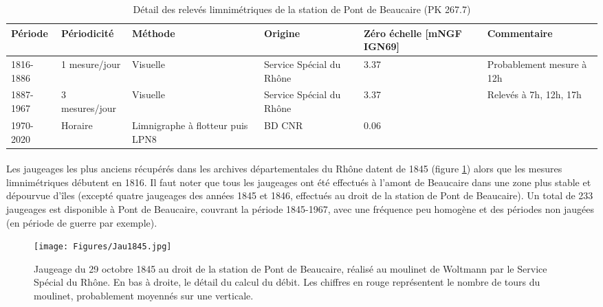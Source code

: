 \documentclass[11pt]{article}
\begin{document}
    
	\begin{table}[h]
	\centering
	\caption{Détail des relevés limnimétriques de la station de Pont de Beaucaire (PK 267.7)}
    \label{tab:MesuresPtBcr}
       \begin{tabular}{| m{2cm} | m{2.6cm}| m{2.2cm} | m{3cm} | m{2.7cm} | m{2.5cm} |} 
                \hline
               Période & Périodicité & Méthode & Origine & Zéro échelle [mNGF IGN69] & Commentaire \\
                \hline
                1816-1886 & 1 mesure/jour & Visuelle & 
                Service Spécial du Rhône & 3.37 & Probablement mesure à 12h \\
                \hline
                1887-1967 & 3 mesures/jour & Visuelle & 
                Service Spécial du Rhône & 3.37 & Relevés à 7h, 12h, 17h\\
                \hline
               1970-2020 & Horaire & Limnigraphe à flotteur puis LPN8 & 
                BD CNR & 0.06 &  \\
                \hline
		\end{tabular}
       \end{table}           
        
       
    \paragraph{} Les jaugeages les plus anciens récupérés dans les archives départementales du Rhône datent de 1845 (figure \ref{fig:Jau1845}) alors que les mesures limnimétriques débutent en 1816. Il faut noter que tous les jaugeages ont été effectués à l'amont de Beaucaire dans une zone plus stable et dépourvue d'îles (excepté quatre jaugeages des années 1845 et 1846, effectués au droit de la station de Pont de Beaucaire). Un total de 233 jaugeages est disponible à Pont de Beaucaire, couvrant la période 1845-1967, avec une fréquence peu homogène et des périodes non jaugées (en période de guerre par exemple). 
    
    \begin{figure}[h]
	\centering
		\texttt{[image: Figures/Jau1845.jpg]}
        \caption{Jaugeage du 29 octobre 1845 au droit de la station de Pont de Beaucaire, réalisé au moulinet de Woltmann par le Service Spécial du Rhône. En bas à droite, le détail du calcul du débit. Les chiffres en rouge représentent le nombre de tours du moulinet, probablement moyennés sur une verticale.}	
		\label{fig:Jau1845}
	\end{figure}
    
\end{document}
